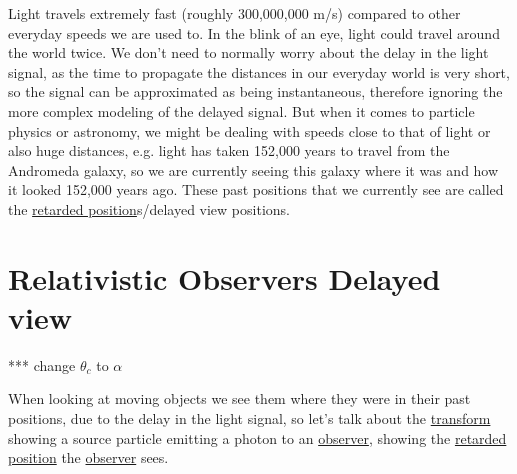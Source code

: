 Light travels extremely fast (roughly 300,000,000 m/s) compared to other everyday speeds we are used to. In the blink of an eye, light could travel around the world twice. We don't need to normally worry about the delay in the light signal, as the time to propagate the distances in our everyday world is very short, so the signal can be approximated as being instantaneous, therefore ignoring the more complex modeling of the delayed signal. But when it comes to particle physics or astronomy, we might be dealing with speeds close to that of light or also huge distances, e.g. light has taken 152,000 years to travel from the Andromeda galaxy, so we are currently seeing this galaxy where it was and how it looked 152,000 years ago. These past positions that we currently see are called the \hyperlink{def-retarded-position}{retarded position}s/delayed view positions.

\section{Relativistic Observers Delayed view}

*** change $\theta_c$ to $\alpha$

When looking at moving objects we see them where they were in their past positions, due to the delay in the light signal, so let's talk about the \hyperlink{def-transform}{transform} showing a source particle emitting a photon to an \hyperlink{def-observer}{observer}, showing the \hyperlink{def-retarded-position}{retarded position} the \hyperlink{def-observer}{observer} sees.

